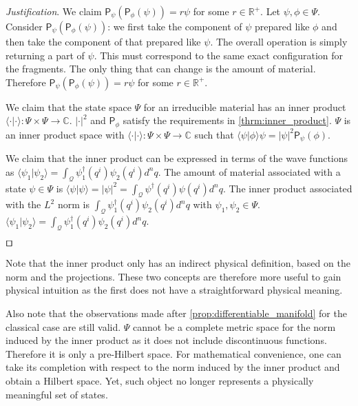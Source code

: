 \documentclass[smallextended]{svjour3}
\numberwithin{equation}{section}
\newenvironment{justification}{\emph{Justification}.}{\hfill\(\qed\)}
\begin{document}
\begin{justification}
	We claim $\mathsf{P}_{\psi} (\mathsf{P}_{\phi} (\psi)) = r \psi$ for some $r \in \mathbb{R}^+$. Let $\psi, \phi \in \Psi$. Consider $\mathsf{P}_{\psi} (\mathsf{P}_{\phi} (\psi))$: we first take the component of $\psi$ prepared like $\phi$ and then take the component of that prepared like $\psi$. The overall operation is simply returning a part of $\psi$. This must correspond to the same exact configuration for the fragments. The only thing that can change is the amount of material. Therefore $\mathsf{P}_{\psi} (\mathsf{P}_{\phi} (\psi)) = r \psi$ for some $r \in \mathbb{R}^+$.
	
	We claim that the state space $\Psi$ for an irreducible material has an inner product $\langle \cdot |\cdot \rangle : \Psi \times \Psi \rightarrow \mathbb{C}$. $| \cdot | ^2$ and $\mathsf{P}_{\phi}$ satisfy the requirements in \ref{thrm:inner_product}. $\Psi$ is an inner product space with $\langle \cdot |\cdot \rangle : \Psi \times \Psi \rightarrow \mathbb{C}$ such that $\langle \psi |\phi \rangle \psi = | \psi | ^2\mathsf{P}_{\psi}(\phi)$.
	
	We claim that the inner product can be expressed in terms of the wave functions as $\langle \psi_1 | \psi_2 \rangle = \int_\mathcal{Q} \psi_1^\dagger (q^i) \psi_2(q^i) d^nq$. The amount of material associated with a state $\psi \in \Psi$ is $\langle \psi | \psi \rangle = | \psi |^2 = \int_\mathcal{Q} \psi^\dagger (q^i) \psi(q^i) d^nq$. The inner product associated with the $L^2$ norm is $\int_\mathcal{Q} \psi_1^\dagger (q^i) \psi_2(q^i) d^nq$ with $\psi_1, \psi_2 \in \Psi$. $\langle \psi_1 | \psi_2 \rangle = \int_\mathcal{Q} \psi_1^\dagger (q^i) \psi_2(q^i) d^nq$.
	
\end{justification}

Note that the inner product only has an indirect physical definition, based on the norm and the projections. These two concepts are therefore more useful to gain physical intuition as the first does not have a straightforward physical meaning.

Also note that the observations made after \ref{prop:differentiable_manifold} for the  classical case are still valid. $\Psi$ cannot be a complete metric space for the norm induced by the inner product as it does not include discontinuous functions. Therefore it is only a pre-Hilbert space. For mathematical convenience, one can take its completion with respect to the norm induced by the inner product and obtain a Hilbert space. Yet, such object no longer represents a physically meaningful set of states.
\end{document}
